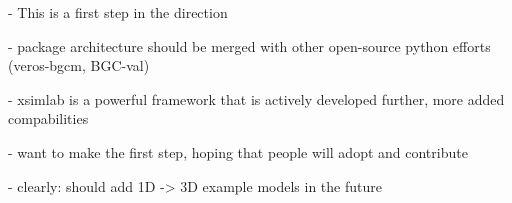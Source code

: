 \documentclass[journal abbreviation, manuscript]{copernicus}
\begin{document}
\conclusions  %

- This is a first step in the direction

- package architecture should be merged with other open-source python efforts (veros-bgcm, BGC-val)

- xsimlab is a powerful framework that is actively developed further, more added compabilities

- want to make the first step, hoping that people will adopt and contribute

- clearly: should add 1D -> 3D example models in the future
\end{document}
